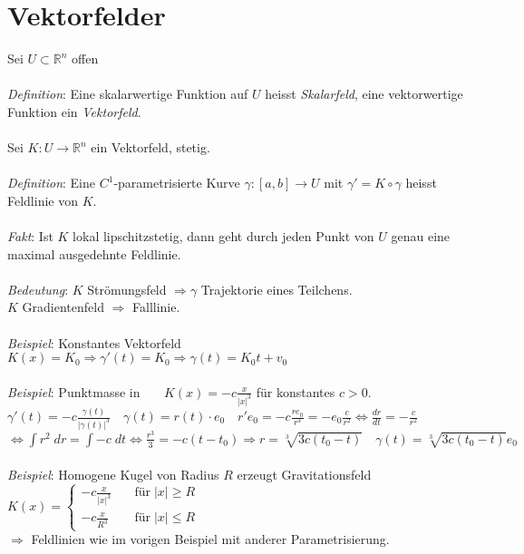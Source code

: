 \documentclass[12pt,a4paper,titlepage]{article}
\newcommand{\setR}{\mathbb{R}}
\newcommand{\threevec}[3]{\mathop{\left(\substack{#1 \\ #2 \\ #3}\right)}}
\begin{document}
\section*{Vektorfelder}
Sei $U\subset\setR^n$ offen\\
\\
\textit{Definition}: Eine skalarwertige Funktion auf $U$ heisst \emph{Skalarfeld}, eine vektorwertige Funktion ein \emph{Vektorfeld}. \\
\\
Sei $K:U\to\setR^n$ ein Vektorfeld, stetig. \\
\\
\textit{Definition}: Eine $C^1$-parametrisierte Kurve $\gamma:[a,b]\to U$ mit $\gamma'=K\circ\gamma$ heisst Feldlinie von $K$. \\
\\
\textit{Fakt}: Ist $K$ lokal lipschitzstetig, dann geht durch jeden Punkt von $U$ genau eine maximal ausgedehnte Feldlinie. \\
\\
\textit{Bedeutung}: $K$ Strömungsfeld $\Rightarrow \gamma$ Trajektorie eines Teilchens. \\
$K$ Gradientenfeld $\Rightarrow$ Falllinie. \\
\\
\textit{Beispiel}: Konstantes Vektorfeld $K(x)=K_0 \Rightarrow \gamma'(t)=K_0 \Rightarrow \gamma(t)=K_0t+v_0$ \\
\\
\textit{Beispiel}: Punktmasse in $\threevec{0}{0}{0} \quad K(x)=-c\frac{x}{|x|^3}$ für konstantes $c>0$. \\
$\gamma'(t)=-c\frac{\gamma(t)}{|\gamma(t)|^3} \quad \gamma(t)=r(t)\cdot e_0 \quad r'e_0=-c\frac{re_0}{r^3}=-e_0\frac{c}{r^2} \iff \frac{dr}{dt}=-\frac{c}{r^2} $ \\
$\iff \int r^2\;dr=\int-c \;dt \iff \frac{r^3}{3} = -c(t-t_0) \Rightarrow r=\sqrt[3]{3c(t_0-t)} \quad \gamma(t)=\sqrt[3]{3c(t_0-t)}e_0$ \\
\\
\textit{Beispiel}: Homogene Kugel von Radius $R$ erzeugt Gravitationsfeld $K(x)=\left\{\begin{array}{ll}
    -c\frac{x}{|x|^3} & \quad\text{für}\; |x|\geq R \\
    -c\frac{x}{R^3} & \quad\text{für}\; |x|\leq R
  \end{array}\right.$ \\
$\Rightarrow$ Feldlinien wie im vorigen Beispiel mit anderer Parametrisierung. \\
\end{document}
